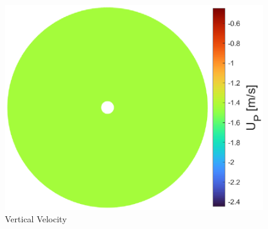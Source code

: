 {\begin{figure}[!htb]
\begin{minipage}{.49\textwidth}
      \includegraphics[width=\textwidth]{Figures/comp_method/sim_B/U_P.eps}
      \caption[Vertical Velocity]{Vertical Velocity}
      \label{fig:imagem3}
    \end{minipage}
\end{figure}

}
